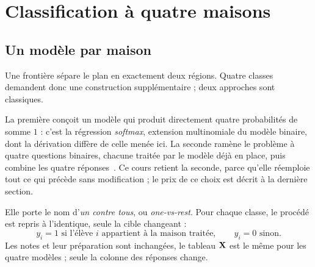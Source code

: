 \chapter{Classification à quatre maisons}
\label{ch:classifieur}


\section{Un modèle par maison}

Une frontière sépare le plan en exactement deux régions. Quatre classes
demandent donc une construction supplémentaire ; deux approches sont
classiques.

La première conçoit un modèle qui produit directement quatre probabilités de
somme $1$ : c'est la régression \emph{softmax}, extension multinomiale du modèle
binaire, dont la dérivation diffère de celle menée ici. La seconde ramène le
problème à quatre questions binaires, chacune traitée par le modèle déjà en
place, puis combine les quatre réponses~\cite{rifkin2004}. Ce cours retient la
seconde, parce qu'elle réemploie tout ce qui précède sans modification ; le prix
de ce choix est décrit à la dernière section.

Elle porte le nom d'\emph{un contre tous}, ou \emph{one-vs-rest}. Pour chaque
classe, le procédé est repris à l'identique, seule la cible changeant :
\[
  y_i=1 \text{ si l'élève } i \text{ appartient à la maison traitée},\qquad
  y_i=0 \text{ sinon.}
\]
Les notes et leur préparation sont inchangées, le tableau $\mathbf{X}$ est le même pour
les quatre modèles ; seule la colonne des réponses change.


